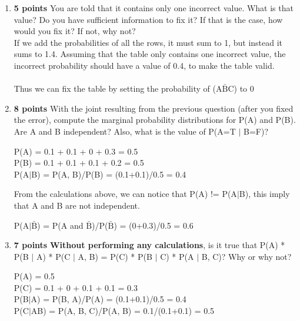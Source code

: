 \documentclass{article}
\def\ans#1{{\color{ans}#1}}
\begin{document}
\begin{enumerate}[label=(\alph*)]
    \item \textbf{5 points} You are told that it contains only one incorrect value. What is that value? Do you have sufficient information to fix it? If that is the case, how would you fix it? If not, why not? \\
    \ans{
        If we add the probabilities of all the rows, it must sum to 1, but instead it sums to 1.4. 
        Assuming that the table only contains one incorrect value, the incorrect probability should have 
        a value of 0.4, to make the table valid. \\ \\
        Thus we can fix the table by setting the probability of (A$\bar{\text{B}}$C) to 0
    } 
    \item \textbf{8 points} With the joint resulting from the previous question (after you fixed the error), compute the marginal probability distributions for P(A) and P(B). Are A and B independent? Also, what is the value of P(A=T $|$ B=F)?  \\
    \ans{
        \begin{center}
            P(A) = 0.1 + 0.1 + 0 + 0.3 = 0.5 \\
            P(B) = 0.1 + 0.1 + 0.1 + 0.2 = 0.5 \\
            P(A$|$B) = P(A, B)/P(B) = (0.1+0.1)/0.5 = 0.4 \\
        \end{center}
        From the calculations above, we can notice that P(A) != P(A$|$B), this imply that A and B 
        are not independent. \\
        \begin{center}
            P(A$|$$\bar{\text{B}}$) = P(A and $\bar{\text{B}}$)/P($\bar{\text{B}}$) = (0+0.3)/0.5 = 0.6 \\
        \end{center}
    }
    \item \textbf{7 points} \textbf{Without performing any calculations}, is it true that P(A) * P(B $|$ A) * P(C $|$ A, B) = P(C) * P(B $|$ C) * P(A $|$ B, C)? Why or why not?\\
    \ans{
        \begin{center}
            P(A) = 0.5 \\
            P(C) = 0.1 + 0 + 0.1 + 0.1 = 0.3 \\
            P(B$|$A) = P(B, A)/P(A) = (0.1+0.1)/0.5 = 0.4 \\
            P(C$|$AB) = P(A, B, C)/P(A, B) = 0.1/(0.1+0.1) = 0.5 \\

\end{center}}
\end{enumerate}
\end{document}
